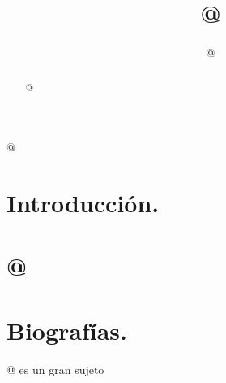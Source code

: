 \documentclass[10pt,final,journal,letterpaper,twoside,twocolumn]{/media/jrao/archivos/documentos/latex/plantillas/IEEEtran}
\title{@}
\author{@}
\begin{document}
\maketitle



\begin{abstract}
@
\end{abstract}

\renewcommand{\IEEEkeywordsname}{Palabras clave}
\begin{IEEEkeywords}
@
\end{IEEEkeywords}


\section{Introducción.}


\appendices
\section{@}


{}

\section*{Biografías.}

\begin{IEEEbiography}[{\texttt{[image: ./@]}}]{@} %
es un gran sujeto
\end{IEEEbiography}
\end{document}
